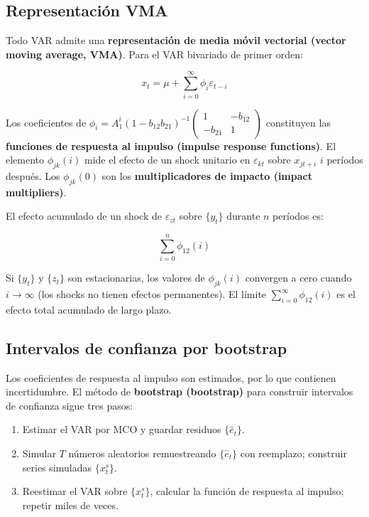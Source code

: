 \documentclass[12pt]{article}
\begin{document}
\subsection{Representaci\'on VMA}

Todo VAR admite una \textbf{representaci\'on de media m\'ovil vectorial (vector moving average, VMA)}. Para el VAR bivariado de primer orden:

\begin{equation}
x_t = \mu + \sum_{i=0}^{\infty} \phi_i \varepsilon_{t-i}
\label{eq:vma}
\end{equation}

\begin{intuicionmat}
Los coeficientes de $\phi_i = A_1^i (1-b_{12}b_{21})^{-1}\begin{pmatrix}1 & -b_{12}\\-b_{21}&1\end{pmatrix}$ constituyen las \textbf{funciones de respuesta al impulso (impulse response functions)}. El elemento $\phi_{jk}(i)$ mide el efecto de un shock unitario en $\varepsilon_{kt}$ sobre $x_{jt+i}$ $i$ per\'iodos despu\'es. Los $\phi_{jk}(0)$ son los \textbf{multiplicadores de impacto (impact multipliers)}.
\end{intuicionmat}

El efecto acumulado de un shock de $\varepsilon_{zt}$ sobre $\{y_t\}$ durante $n$ per\'iodos es:

\begin{equation}
\sum_{i=0}^{n} \phi_{12}(i)
\end{equation}

\begin{intuicionmat}
Si $\{y_t\}$ y $\{z_t\}$ son estacionarias, los valores de $\phi_{jk}(i)$ convergen a cero cuando $i \to \infty$ (los shocks no tienen efectos permanentes). El l\'imite $\sum_{i=0}^{\infty}\phi_{12}(i)$ es el efecto total acumulado de largo plazo.
\end{intuicionmat}

\subsection{Intervalos de confianza por bootstrap}

Los coeficientes de respuesta al impulso son estimados, por lo que contienen incertidumbre. El m\'etodo de \textbf{bootstrap (bootstrap)} para construir intervalos de confianza sigue tres pasos:

\begin{enumerate}
  \item Estimar el VAR por MCO y guardar residuos $\{\hat{e}_t\}$.
  \item Simular $T$ n\'umeros aleatorios remuestreando $\{\hat{e}_t\}$ con reemplazo; construir series simuladas $\{x_t^s\}$.
  \item Reestimar el VAR sobre $\{x_t^s\}$, calcular la funci\'on de respuesta al impulso; repetir miles de veces.
\end{enumerate}
\end{document}
